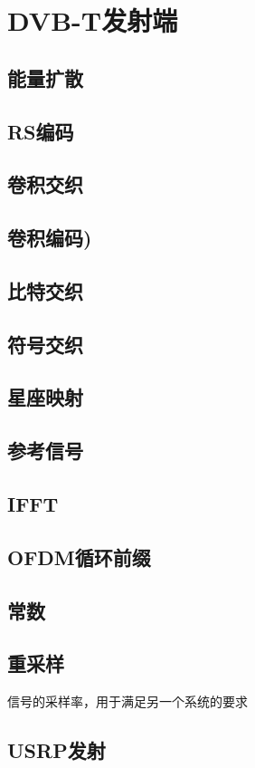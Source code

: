 \chapter{DVB-T发射端}
\section{能量扩散}
\section{RS编码}
\section{卷积交织}
\section{卷积编码)}
\section{比特交织}
\section{符号交织}
\section{星座映射}
\section{参考信号}
\section{IFFT}
\section{OFDM循环前缀}
\section{常数}
\section{重采样}
信号的采样率，用于满足另一个系统的要求
\section{USRP发射}
\endinput